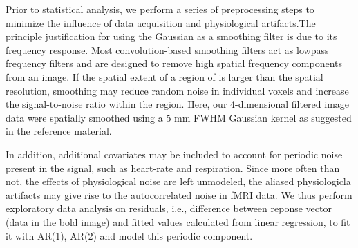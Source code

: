 \par \indent Prior to statistical analysis, we perform a series of
preprocessing steps to minimize the influence of data acquisition and 
physiological artifacts.The principle justification for using the Gaussian as a 
smoothing filter is due to its frequency response. Most convolution-based 
smoothing filters act as lowpass frequency filters and are designed to remove 
high spatial frequency components from an image. If the spatial 
extent of a region of is larger than the spatial resolution, smoothing may 
reduce random noise in individual voxels and increase the signal-to-noise ratio 
within the region. Here, our 4-dimensional filtered image data  were spatially smoothed using a 5 mm FWHM Gaussian kernel as suggested in the reference material.
\par \indent In addition, additional covariates may be included to account for
periodic noise present in the signal, such as heart-rate and respiration. 
Since more often than not, the effects of physiological noise are left
unmodeled, the aliased physiologicla artifacts may give rise to the
autocorrelated noise in fMRI data. We thus perform exploratory data analysis on 
residuals, i.e., difference between reponse vector (data in the bold image) and 
fitted values calculated from linear regression, to fit it with AR(1), AR(2) 
and model this periodic component. 
